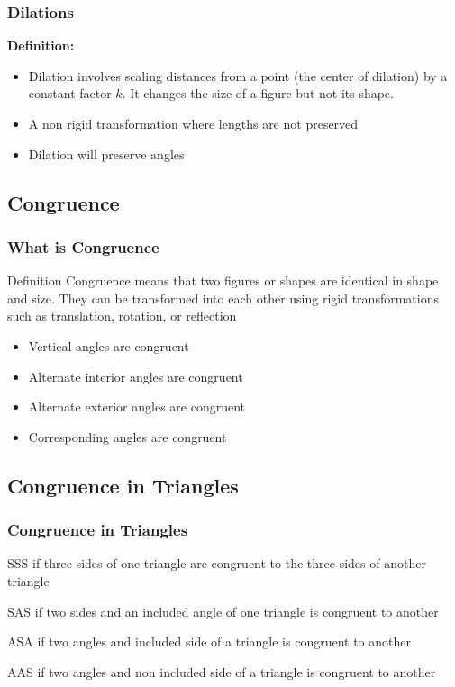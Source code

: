\documentclass{beamer}
\begin{document}
  \begin{frame}
    \frametitle{Dilations}
    \textbf{Definition:}
        \begin{itemize}
            \item Dilation involves scaling distances from a point (the center of dilation) by a constant factor $k$. It changes the size of a figure but not its shape.
        \end{itemize}
    \begin{itemize}
        \item A non rigid transformation where lengths are not preserved 
        \item Dilation will preserve angles 
    \end{itemize}
\end{frame}
    \subsection{Congruence}
    \begin{frame}
        \frametitle{What is Congruence}
        \begin{block}{Definition}
            Congruence means that two figures or shapes are identical in shape and size. 
            They can be transformed into each other using rigid transformations such as translation, rotation, or reflection 
        \end{block}

        \begin{itemize}
            \item Vertical angles are congruent
            \item Alternate interior angles are congruent
            \item Alternate exterior angles are congruent
            \item Corresponding angles are congruent
        \end{itemize}
    \end{frame}

    \subsection{Congruence in Triangles}
    \begin{frame}
        \frametitle{Congruence in Triangles}
        \begin{block}{SSS}
            if three sides of one triangle are congruent to the three sides of another triangle
        \end{block}
        \begin{block}{SAS}
            if two sides and an included angle of one triangle is congruent to another
        \end{block}
        \begin{block}{ASA}
            if two angles and included side of a triangle is  congruent to another 
        \end{block}
        \begin{block}{AAS}
            if two angles and non included side of a triangle is congruent to another 
        \end{block}
    \end{frame}
\end{document}

